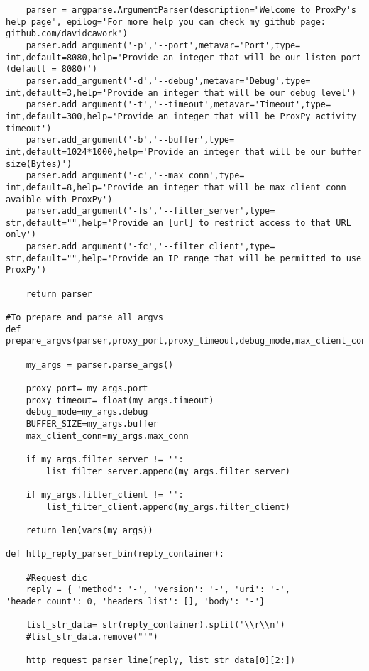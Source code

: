 \begin{verbatim}
    parser = argparse.ArgumentParser(description="Welcome to ProxPy's help page", epilog='For more help you can check my github page:  github.com/davidcawork')
    parser.add_argument('-p','--port',metavar='Port',type= int,default=8080,help='Provide an integer that will be our listen port (default = 8080)')
    parser.add_argument('-d','--debug',metavar='Debug',type= int,default=3,help='Provide an integer that will be our debug level')
    parser.add_argument('-t','--timeout',metavar='Timeout',type= int,default=300,help='Provide an integer that will be ProxPy activity timeout')
    parser.add_argument('-b','--buffer',type= int,default=1024*1000,help='Provide an integer that will be our buffer size(Bytes)')
    parser.add_argument('-c','--max_conn',type= int,default=8,help='Provide an integer that will be max client conn avaible with ProxPy')
    parser.add_argument('-fs','--filter_server',type= str,default="",help='Provide an [url] to restrict access to that URL only')
    parser.add_argument('-fc','--filter_client',type= str,default="",help='Provide an IP range that will be permitted to use ProxPy')

    return parser

#To prepare and parse all argvs
def prepare_argvs(parser,proxy_port,proxy_timeout,debug_mode,max_client_conn,BUFFER_SIZE,list_filter_server,list_filter_client):

    my_args = parser.parse_args()

    proxy_port= my_args.port
    proxy_timeout= float(my_args.timeout)
    debug_mode=my_args.debug
    BUFFER_SIZE=my_args.buffer
    max_client_conn=my_args.max_conn

    if my_args.filter_server != '':
        list_filter_server.append(my_args.filter_server)

    if my_args.filter_client != '': 
        list_filter_client.append(my_args.filter_client)

    return len(vars(my_args))

def http_reply_parser_bin(reply_container):

    #Request dic
    reply = { 'method': '-', 'version': '-', 'uri': '-', 'header_count': 0, 'headers_list': [], 'body': '-'}
    
    list_str_data= str(reply_container).split('\\r\\n')
    #list_str_data.remove("'")

    http_request_parser_line(reply, list_str_data[0][2:])


\end{verbatim}

